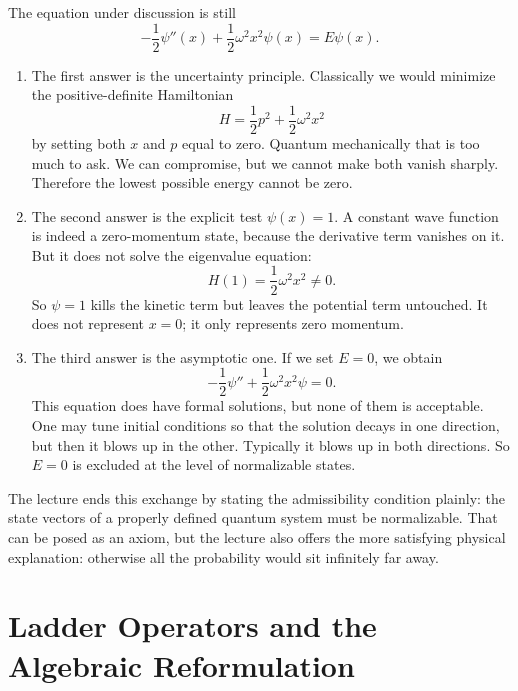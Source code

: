 The equation under discussion is still
\begin{equation}
-\frac{1}{2}\psi''(x)+\frac{1}{2}\omega^{2}x^{2}\psi(x)=E\psi(x).
\end{equation}

\begin{enumerate}
\item The first answer is the uncertainty principle. Classically we would minimize the positive-definite Hamiltonian
\begin{equation}
H=\frac{1}{2}p^{2}+\frac{1}{2}\omega^{2}x^{2}
\end{equation}
by setting both \(x\) and \(p\) equal to zero. Quantum mechanically that is too much to ask. We can compromise, but we cannot make both vanish sharply. Therefore the lowest possible energy cannot be zero.

\item The second answer is the explicit test \(\psi(x)=1\). A constant wave function is indeed a zero-momentum state, because the derivative term vanishes on it. But it does not solve the eigenvalue equation:
\begin{equation}
H(1)=\frac{1}{2}\omega^{2}x^{2}\neq 0.
\end{equation}
So \(\psi=1\) kills the kinetic term but leaves the potential term untouched. It does not represent \(x=0\); it only represents zero momentum.

\item The third answer is the asymptotic one. If we set \(E=0\), we obtain
\begin{equation}
-\frac{1}{2}\psi''+\frac{1}{2}\omega^{2}x^{2}\psi=0.
\end{equation}
This equation does have formal solutions, but none of them is acceptable. One may tune initial conditions so that the solution decays in one direction, but then it blows up in the other. Typically it blows up in both directions. So \(E=0\) is excluded at the level of normalizable states.
\end{enumerate}

The lecture ends this exchange by stating the admissibility condition plainly: the state vectors of a properly defined quantum system must be normalizable. That can be posed as an axiom, but the lecture also offers the more satisfying physical explanation: otherwise all the probability would sit infinitely far away.

\section{Ladder Operators and the Algebraic Reformulation}

